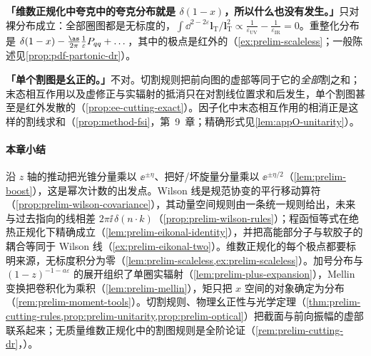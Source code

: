 \begin{tcolorbox}[enhanced,breakable,title=常见误解,fonttitle=\bfseries,
  colback=gray!3!white,colframe=gray!55!black,boxrule=0.6pt,arc=2pt,
  left=5pt,right=5pt,top=3pt,bottom=3pt,before skip=6pt,after skip=6pt]
\textbf{「维数正规化中夸克中的夸克分布就是 $\delta(1-x)$，所以什么也没有发生。」}只对裸分布成立：全部圈图都是无标度的，$\int\dd^{2-2\varepsilon}\mathbf l_{\mathrm T}/\mathbf l_{\mathrm T}^2\propto\frac1{\varepsilon_{\mathrm{UV}}}-\frac1{\varepsilon_{\mathrm{IR}}}=0$。重整化分布是 $\delta(1-x)-\frac{\as}{2\pi}\frac1\varepsilon P_{qq}+\dots$，其中的极点是红外的（\cref{ex:prelim-scaleless}；一般陈述见\cref{prop:pdf-partonic-dr}）。\par
\textbf{「单个割图是幺正的。」}不对。切割规则把前向图的虚部等同于它的\emph{全部}割之和；末态相互作用以及虚修正与实辐射的抵消只在对割线位置求和后发生，单个割图甚至是红外发散的（\cref{prop:ee-cutting-exact}）。因子化中末态相互作用的相消正是这样的割线求和（\cref{prop:method-fsi}，第~9~章；精确形式见\cref{lem:appO-unitarity}）。
\end{tcolorbox}
\paragraph{本章小结}
沿 $z$ 轴的推动把光锥分量乘以 $\ee^{\pm\eta}$、把好/坏旋量分量乘以 $\ee^{\pm\eta/2}$（\cref{lem:prelim-boost}），这是幂次计数的出发点。Wilson 线是规范协变的平行移动算符（\cref{prop:prelim-wilson-covariance}），其动量空间规则由一条统一规则给出，未来与过去指向的线相差 $2\pi\ii\,\delta(n\cdot k)$（\cref{prop:prelim-wilson-rules}）；程函恒等式在绝热正规化下精确成立（\cref{lem:prelim-eikonal-identity}），并把高能部分子与软胶子的耦合等同于 Wilson 线（\cref{ex:prelim-eikonal-two}）。维数正规化的每个极点都要标明来源，无标度积分为零（\cref{lem:prelim-scaleless,ex:prelim-scaleless}）。加号分布与 $(1-z)^{-1-a\varepsilon}$ 的展开组织了单圈实辐射（\cref{lem:prelim-plus-expansion}），Mellin 变换把卷积化为乘积（\cref{lem:prelim-mellin}），矩只把 $x$ 空间的对象确定为分布（\cref{rem:prelim-moment-tools}）。切割规则、物理幺正性与光学定理（\cref{thm:prelim-cutting-rules,prop:prelim-unitarity,prop:prelim-optical}）把截面与前向振幅的虚部联系起来；无质量维数正规化中的割图规则是全阶论证（\cref{rem:prelim-cutting-dr}，\tagA）。

